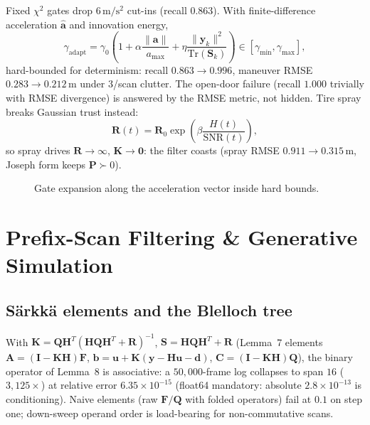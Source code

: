 \documentclass[11pt,oneside]{book}
\begin{document}
Fixed $\chi^2$ gates drop $6\,\mathrm{m/s^2}$ cut-ins (recall $0.863$).
With finite-difference acceleration $\hat{\mathbf{a}}$ and innovation
energy,
\begin{equation}
\boxed{\gamma_{\mathrm{adapt}}=\gamma_0\left(1
+\alpha\frac{\|\mathbf{a}\|}{a_{\max}}
+\eta\frac{\|\mathbf{y}_k\|^2}{\mathrm{Tr}(\mathbf{S}_k)}\right)
\in[\gamma_{\min},\gamma_{\max}],}
\label{eq:gamma}
\end{equation}
hard-bounded for determinism: recall $0.863\to0.996$, maneuver RMSE
$0.283\to0.212\,\mathrm{m}$ under $3$/scan clutter. The open-door failure
(recall $1.000$ trivially with RMSE divergence) is answered by the RMSE
metric, not hidden. Tire spray breaks Gaussian trust instead:
\begin{equation}
\boxed{\mathbf{R}(t)=\mathbf{R}_0\exp\!\left(\beta\frac{H(t)}{\mathrm{SNR}(t)}\right),}
\label{eq:spectral-r}
\end{equation}
so spray drives $\mathbf{R}\!\to\!\infty$, $\mathbf{K}\!\to\!\mathbf{0}$: the
filter coasts (spray RMSE $0.911\to0.315\,\mathrm{m}$, Joseph form keeps
$\mathbf{P}\succ0$).

\begin{figure}[htbp]
\centering
{}
\caption{Gate expansion along the acceleration vector inside hard bounds.}
\label{fig:gate}
\end{figure}

\chapter{Prefix-Scan Filtering \& Generative Simulation}
\label{ch:prefix-radarsplat}

\section{S\"arkk\"a elements and the Blelloch tree}
\label{sec:sarkka}

With $\mathbf{K}=\mathbf{QH}^T(\mathbf{HQH}^T+\mathbf{R})^{-1}$,
$\mathbf{S}=\mathbf{HQH}^T+\mathbf{R}$ (Lemma~7 elements
$\mathbf{A}=(\mathbf{I}-\mathbf{KH})\mathbf{F}$,
$\mathbf{b}=\mathbf{u}+\mathbf{K}(\mathbf{y}-\mathbf{Hu}-\mathbf{d})$,
$\mathbf{C}=(\mathbf{I}-\mathbf{KH})\mathbf{Q}$), the binary operator of
Lemma~8 is associative: a $50{,}000$-frame log collapses to span $16$
($3{,}125\times$) at relative error $6.35\times10^{-15}$ (float64
mandatory: absolute $2.8\times10^{-13}$ is conditioning). Naive elements
(raw $\mathbf{F}/\mathbf{Q}$ with folded operators) fail at $0.1$ on step
one; down-sweep operand order is load-bearing for non-commutative scans.
\end{document}
